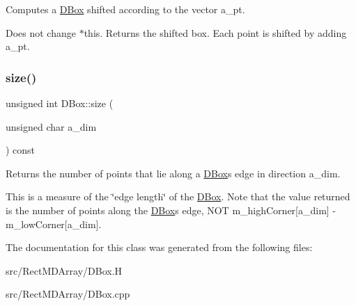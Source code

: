 Computes a \hyperlink{class_d_box}{D\+Box} shifted according to the vector a\+\_\+pt. 

Does not change $\ast$this. Returns the shifted box. Each point is shifted by adding a\+\_\+pt. \mbox{\label{class_d_box_a9f3523e560c447da80e405afbcb5b0ea}} 
\subsubsection{\texorpdfstring{size()}{size()}}
{\footnotesize\ttfamily unsigned int D\+Box\+::size (\begin{DoxyParamCaption}\item[{unsigned char}]{a\+\_\+dim }\end{DoxyParamCaption}) const\hspace{0.3cm}{\ttfamily [inline]}}



Returns the number of points that lie along a \hyperlink{class_d_box}{D\+Box}\textquotesingle{}s edge in direction a\+\_\+dim. 

This is a measure of the \char`\"{}edge length\char`\"{} of the \hyperlink{class_d_box}{D\+Box}. Note that the value returned is the number of points along the \hyperlink{class_d_box}{D\+Box}\textquotesingle{}s edge, N\+OT m\+\_\+high\+Corner\mbox{[}a\+\_\+dim\mbox{]} -\/ m\+\_\+low\+Corner\mbox{[}a\+\_\+dim\mbox{]}. 

The documentation for this class was generated from the following files\+:\begin{DoxyCompactItemize}
\item 
src/\+Rect\+M\+D\+Array/D\+Box.\+H\item 
src/\+Rect\+M\+D\+Array/D\+Box.\+cpp\end{DoxyCompactItemize}
